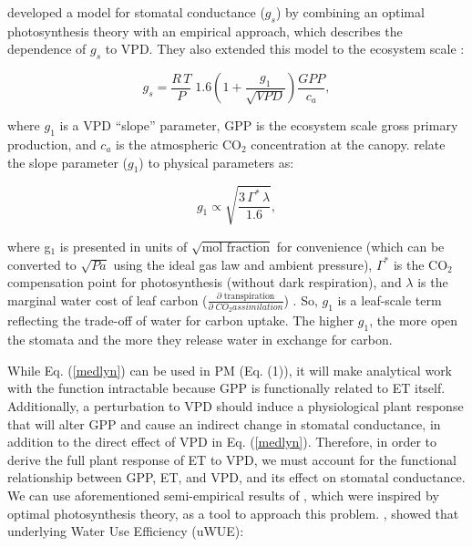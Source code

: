 \documentclass[draft]{agujournal2019}
\begin{document}
 developed a model for stomatal conductance ($g_s$)
by combining an optimal photosynthesis theory \cite{Cowan_1977} with
an empirical approach, which describes the dependence of $g_s$ to
VPD. They also extended this model to the ecosystem scale
\cite{Medlyn_2017}:

  \begin{equation}
    g_s = \frac{R \,T}{P} \; 1.6 \left(1 + \frac{g_1}{\sqrt{VPD}}\right) \frac{GPP}{c_a},
    \label{medlyn}
  \end{equation}

  where $g_{1}$ is a VPD ``slope'' parameter, GPP is the ecosystem
  scale gross primary production, and $c_a$ is the atmospheric CO$_2$
  concentration at the canopy. \cite{MEDLYN_2011} relate the slope
  parameter ($g_{1}$) to physical parameters as:

  \begin{equation}
    g_{1}  \propto \sqrt{\frac{3 \, \Gamma^* \,
        \lambda}{1.6}},
    \label{slope}
  \end{equation}


  where g$_1$ is presented in units of $\sqrt{\text{mol fraction}}$ for
  convenience (which can be converted to $\sqrt{Pa}$ using the ideal
  gas law and ambient pressure), $\Gamma^*$ is the CO$_2$ compensation
  point for photosynthesis (without dark respiration), and $\lambda$
  is the marginal water cost of leaf carbon
  ($\frac{\partial \; \text{transpiration}}{\partial \; CO_2
    assimilation}$) \cite{Farquhar_1980, Katul_2009}. So, $g_{1}$ is a
  leaf-scale term reflecting the trade-off of water for carbon
  uptake. The higher $g_{1}$, the more open the stomata and the more
  they release water in exchange for carbon.


While Eq. (\ref{medlyn}) can be used in PM (Eq. (1)), it will make
analytical work with the function intractable because GPP is
functionally related to ET itself. Additionally, a perturbation to VPD
should induce a physiological plant response that will alter GPP and
cause an indirect change in stomatal conductance, in addition to the
direct effect of VPD in Eq. (\ref{medlyn}). Therefore, in order to
derive the full plant response of ET to VPD, we must account for the
functional relationship between GPP, ET, and VPD, and its effect on
stomatal conductance. We can use aforementioned semi-empirical results
of , which were inspired by optimal photosynthesis
theory, as a tool to approach this problem. , showed
that underlying Water Use Efficiency (uWUE):
\end{document}
